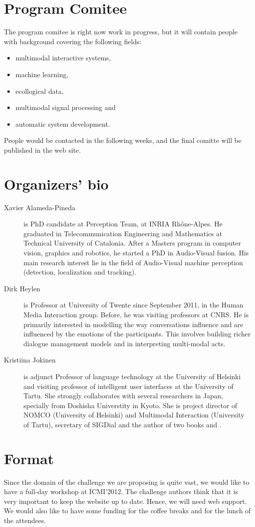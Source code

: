 \documentclass{sig-alternate}
\begin{document}
\section{Program Comitee}
The program comitee is right now work in progress, but it will contain people with background covering the following
fields:
\begin{itemize}
 \item multimodal interactive systems,
 \item machine learning,
 \item ecollogical data,
 \item multimodal signal processing and
 \item automatic system development.
\end{itemize}
People would be contacted in the following weeks, and the final comitte will be published in the web site.

\section{Organizers' bio}
\begin{description}
 \item [Xavier Alameda-Pineda] is PhD candidate at Perception Team, at INRIA Rh\^one-Alpes. He graduated in
Telecommunication Engineering and Mathematics at Technical University of Catalonia. After a Masters program in computer
vision, graphics and robotics, he started a PhD in Audio-Visual fusion. His main research interest lie in the field of
Audio-Visual machine perception (detection, localization and tracking).
 \item [Dirk Heylen] is Professor at University of Twente since September 2011, in the Human Media Interaction group.
Before, he was visiting professors at CNRS. He is primarily interested in modelling the way conversations influence and
are influenced by the emotions of the participants. This involves building richer dialogue management models and in
interpreting multi-modal acts.
 \item [Kristiina Jokinen] is adjunct Professor of language technology at the University of Helsinki and visiting
professor of intelligent user interfaces at the University of Tartu. She strongly collaborates with
several researchers in Japan, specially from Doshisha Universtity in Kyoto. She is project director of NOMCO
(University of Helsinki) and Multimodal Interaction (University of Tartu), secretary of SIGDial and the author of two
books \cite{Jokinen09} and \cite{Jokinen09a}.	
\end{description}

\section{Format}
Since the domain of the challenge we are proposing is quite vast, we would like to have a full-day workshop at
ICMI'2012. The challenge authors think that it is very important to keep the website up to date. Hence, we will need
web support. We would also like to have some funding for the coffee breaks and for the lunch of the attendees.



\end{document}
